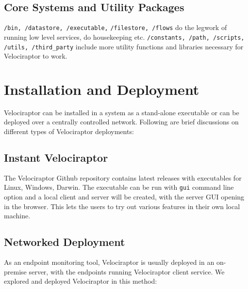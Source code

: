 \documentclass[a4paper, 11pt, oneside]{article} %
\begin{document}
\subsection{Core Systems and Utility Packages}
\verb|/bin, /datastore, /executable,| \verb|/filestore, /flows| do the legwork of running low level services, do housekeeping etc. \verb|/constants, /path, /scripts,| \verb|/utils, /third_party| include more utility functions and libraries necessary for Velociraptor to work.

\section{Installation and Deployment}
Velociraptor can be installed in a system as a stand-alone executable or can be deployed over a centrally controlled network. Following are brief discussions on different types of Velociraptor deployments:

\subsection{Instant Velociraptor} \label{instantvel}
The Velociraptor Github repository contains latest releases with executables for Linux, Windows, Darwin. The executable can be run with \verb|gui| command line option and a local client and server will be created, with the server GUI opening in the browser. This lets the users to try out various features in their own local machine.

\subsection{Networked Deployment} As an endpoint monitoring tool, Velociraptor is usually deployed in an on-premise server, with the endpoints running Velociraptor client service. We explored and deployed Velociraptor in this method:
\end{document}

